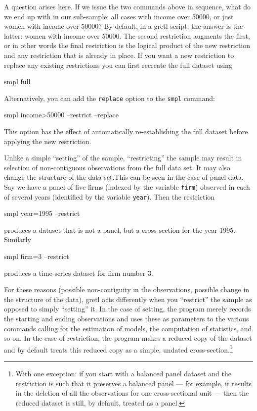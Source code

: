 A question arises here.  If we issue the two commands above in
sequence, what do we end up with in our sub-sample: all cases with
income over 50000, or just women with income over 50000? By default,
in a gretl script, the answer is the latter: women with income over
50000.  The second restriction augments the first, or in other words
the final restriction is the logical product of the new restriction
and any restriction that is already in place.  If you want a new
restriction to replace any existing restrictions you can first
recreate the full dataset using
%
\begin{code}
    smpl full
\end{code}
%
Alternatively, you can add the \verb+replace+ option to the
\verb+smpl+ command:
%
\begin{code}
    smpl income>50000 --restrict --replace
\end{code}

This option has the effect of automatically re-establishing the full
dataset before applying the new restriction.

Unlike a simple ``setting'' of the sample, ``restricting'' the sample
may result in selection of non-contiguous observations from the full
data set.  It may also change the structure of the data set.This can
be seen in the case of panel data.  Say we have a panel of five firms
(indexed by the variable \verb+firm+) observed in each of several
years (identified by the variable \verb+year+).  Then the restriction
%
\begin{code}
    smpl year=1995 --restrict
\end{code}
%
produces a dataset that is not a panel, but a cross-section for the
year 1995.  Similarly
%
\begin{code}
    smpl firm=3 --restrict
\end{code}
%
produces a time-series dataset for firm number 3.

For these reasons (possible non-contiguity in the observations,
possible change in the structure of the data), gretl acts differently
when you ``restrict'' the sample as opposed to simply ``setting'' it.
In the case of setting, the program merely records the starting and
ending observations and uses these as parameters to the various
commands calling for the estimation of models, the computation of
statistics, and so on. In the case of restriction, the program makes a
reduced copy of the dataset and by default treats this reduced copy as
a simple, undated cross-section.\footnote{With one exception: if you
  start with a balanced panel dataset and the restriction is such that
  it preserves a balanced panel --- for example, it results in the
  deletion of all the observations for one cross-sectional unit ---
  then the reduced dataset is still, by default, treated as a panel.}

